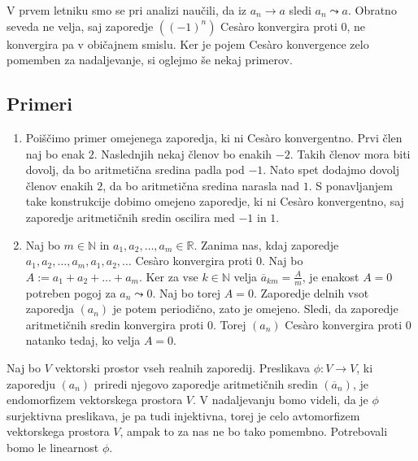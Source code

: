 \documentclass[a4paper,12pt]{article}
\theoremstyle{definition}
\theoremstyle{plain}
\begin{document}
V prvem letniku smo se pri analizi naučili, da iz $a_n \rightarrow a$ sledi $a_n \leadsto a$. Obratno seveda ne velja, saj zaporedje $((-1)^n)$ Ces\`{a}ro konvergira proti $0$, ne konvergira pa v običajnem smislu. Ker je pojem Ces\`{a}ro konvergence zelo pomemben za nadaljevanje, si oglejmo še nekaj primerov.

\subsection*{Primeri}
\begin{enumerate}
    \item Poiščimo primer omejenega zaporedja, ki ni Ces\`{a}ro konvergentno. Prvi člen naj bo enak $2$. Naslednjih nekaj členov bo enakih $-2$. Takih členov mora biti dovolj, da bo aritmetična sredina padla pod $-1$. Nato spet dodajmo dovolj členov enakih $2$, da bo aritmetična sredina narasla nad $1$. S ponavljanjem take konstrukcije dobimo omejeno zaporedje, ki ni Ces\`{a}ro konvergentno, saj zaporedje aritmetičnih sredin oscilira med $-1$ in $1$.
    \item Naj bo $m \in \mathbb{N}$ in $a_1, a_2, \ldots, a_m \in \mathbb{R}$. Zanima nas, kdaj zaporedje $a_1, a_2, \ldots, a_m, a_1, a_2, \ldots$ Ces\`{a}ro konvergira proti $0$. Naj bo $A := a_1 + a_2 + \ldots + a_m$. Ker za vse $k \in \mathbb{N}$ velja $\overline{a}_{km} = \frac{A}{m}$, je enakost $A = 0$ potreben pogoj za $a_n \leadsto 0$. Naj bo torej $A = 0$. Zaporedje delnih vsot zaporedja $(a_n)$ je potem periodično, zato je omejeno. Sledi, da zaporedje aritmetičnih sredin konvergira proti $0$. Torej $(a_n)$ Ces\`{a}ro konvergira proti $0$ natanko tedaj, ko velja $A = 0$.
\end{enumerate}

Naj bo $V$ vektorski prostor vseh realnih zaporedij. Preslikava $\phi: V \rightarrow V$, ki zaporedju $(a_n)$ priredi njegovo zaporedje aritmetičnih sredin $(\overline{a}_n)$, je endomorfizem vektorskega prostora $V$. V nadaljevanju bomo videli, da je $\phi$ surjektivna preslikava, je pa tudi injektivna, torej je celo avtomorfizem vektorskega prostora $V$, ampak to za nas ne bo tako pomembno. Potrebovali bomo le linearnost $\phi$. 
\end{document}

